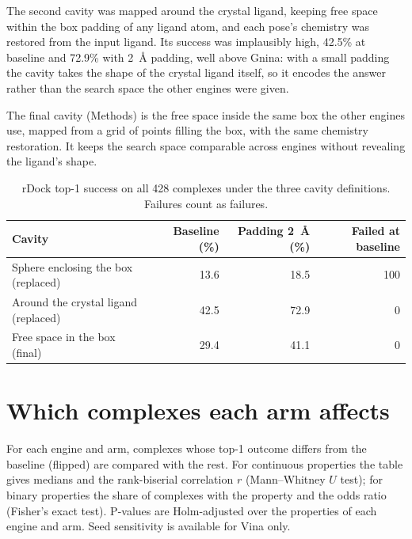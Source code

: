 \documentclass[11pt]{article}
\begin{document}
The second cavity was mapped around the crystal ligand, keeping free space within the box
padding of any ligand atom, and each pose's chemistry was restored from the input ligand.
Its success was implausibly high, 42.5\% at baseline and 72.9\% with
\SI{2}{\angstrom} padding, well above Gnina: with a small padding the cavity takes the shape
of the crystal ligand itself, so it encodes the answer rather than the search space the
other engines were given.

The final cavity (Methods) is the free space inside the same box the other engines use,
mapped from a grid of points filling the box, with the same chemistry restoration. It keeps
the search space comparable across engines without revealing the ligand's shape.

\begin{table}[h]
  \centering
  \caption{rDock top-1 success on all 428 complexes under the three cavity definitions.
    Failures count as failures.}
  \label{tab:si-rdock-versions}
  \small
  \begin{tabular}{lrrr}
    \toprule
    Cavity & Baseline (\%) & Padding \SI{2}{\angstrom} (\%) & Failed at baseline \\
    \midrule
    Sphere enclosing the box (replaced) & 13.6 & 18.5 & 100 \\
    Around the crystal ligand (replaced) & 42.5 & 72.9 & 0 \\
    Free space in the box (final) & 29.4 & 41.1 & 0 \\
    \bottomrule
  \end{tabular}
\end{table}

\clearpage
\section{Which complexes each arm affects}

For each engine and arm, complexes whose top-1 outcome differs from the baseline
(flipped) are compared with the rest. For continuous properties the table gives medians
and the rank-biserial correlation $r$ (Mann--Whitney $U$ test); for binary properties the
share of complexes with the property and the odds ratio (Fisher's exact test). P-values
are Holm-adjusted over the properties of each engine and arm. Seed sensitivity is
available for Vina only.

\newcommand{\SensitivityCaption}{Ligand and complex properties of flipped and unflipped
  complexes, all 428 complexes.}
{\footnotesize}



\end{document}
